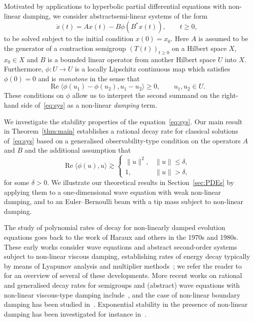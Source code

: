 \documentclass[11pt, a4paper]{amsart}
\DeclareMathOperator*{\R}{Re}
\newcommand{\T}{(T(t))_{t\ge0}}
\theoremstyle{definition}
\numberwithin{equation}{section}
\begin{document}
Motivated by applications to hyperbolic partial differential equations with non-linear damping, we consider abstractsemi-linear systems of the form
\begin{equation}\label{eq:sys}
\dot x(t)=Ax(t) - B\phi(B^\ast x(t)), \qquad t\ge0,
\end{equation}
to be solved subject to the initial condition $x(0)=x_0$.
Here $A$ is assumed to be the generator of a contraction semigroup $\T$ on a Hilbert space $X$, $x_0\in X$ and $B$ is a bounded linear operator from  another Hilbert space $U$ into $X$. Furthermore, $\phi\colon U\to U$ is a locally Lipschitz continuous map which satisfies $\phi(0)=0$ and is \emph{monotone} in the sense that
$$\R\langle\phi(u_1)-\phi(u_2),u_1-u_2\rangle\ge0,\qquad u_1,u_2\in U.$$  These conditions on $\phi$ allow us to interpret the second summand on the right-hand side of~\eqref{eq:sys} as a non-linear \emph{damping} term.

We investigate the stability properties of the equation~\eqref{eq:sys}. Our main result in Theorem~\ref{thm:main} establishes a rational decay rate for classical solutions of~\eqref{eq:sys} based on a generalised observability-type condition on the operators $A$ and $B$ and the additional assumption that 
\begin{equation}
\label{eq:PhiAssStab}
\R\langle\phi(u),u\rangle \gtrsim
\begin{cases}
 \|u\|^2, &   \|u\|\le\delta,\\
1,  &\|u\|>\delta,
\end{cases}
\end{equation}
for some $\delta>0$. We illustrate our theoretical results in Section~\ref{sec:PDEs} by applying them to a one-dimensional wave equation with weak non-linear damping, and to an Euler--Bernoulli beam  with a tip mass subject to non-linear damping.

The study of polynomial rates of decay for non-linearly damped evolution equations goes back to the work of Haraux and others in the 1970s and 1980s. These early works consider wave equations and abstract second-order systems subject to non-linear viscous damping,  establishing rates of energy decay typically by means of Lyapunov analysis and multiplier methods~\cite{Har87, HarZua88, KakNis79, Nak78, Nak83, Zua88}; we refer the reader to~\cite[Chap.~5 \& 6]{Zua24book} for an overview of several of these developments. More recent works on rational and generalised decay rates for semigroups and (abstract) wave equations with non-linear viscous-type damping include~\cite{Ala10,AlaPri17,ChiKaf25,Kom94a, Nak10}, and the case of non-linear boundary damping has been studied in~\cite{Ala05,LasTat93,VanMar00,VanFer23,XuXu19}. 
Exponential stability in the presence of non-linear damping has been investigated for instance
 in~\cite{ChiMar21,GuiLog19,MarChi20,Teb20}.
\end{document}
